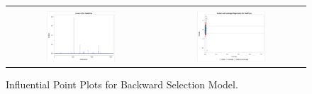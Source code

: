 \documentclass[11pt]{scrartcl} %
\begin{document}
\begin{figure}[H] %
	\centering
	\begin{tabular}{p{} p{}}
\hline	
	\multicolumn{1}{|c}{} &  \multicolumn{1}{c|}{} \\
		\multicolumn{1}{|c}{\includegraphics[width=0.48\textwidth]{../graphics/A2BWcooks}} &
		\multicolumn{1}{c|}{\includegraphics[width=0.48\textwidth]{../graphics/A2BWlev}}\\
		\hline
	\end{tabular}		
	\caption{Influential Point Plots for Backward Selection Model.}
	\label{fig:A2BWIP}
\end{figure}
\end{document}
